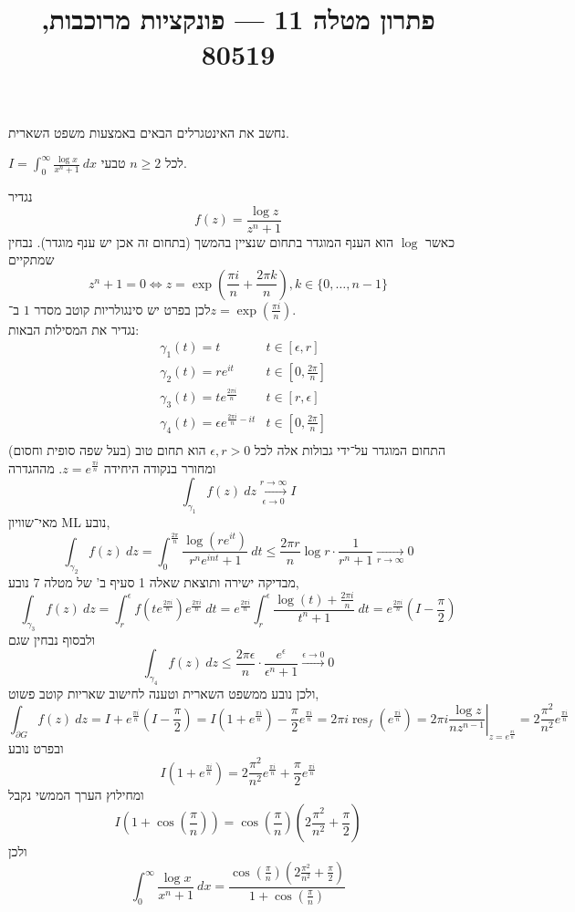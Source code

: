 
\title{פתרון מטלה 11 --- פונקציות מרוכבות, 80519}


\maketitle
\maketitleprint{}

\question{}
נחשב את האינטגרלים הבאים באמצעות משפט השארית.

\subquestion{}
$I = \int_0^\infty \frac{\log x}{x^n + 1}\ dx$ לכל $n \ge 2$ טבעי.
\begin{solution}
	נגדיר
	\[
		f(z) = \frac{\log z}{z^n + 1}
	\]
	כאשר $\log$ הוא הענף המוגדר בתחום שנציין בהמשך (בתחום זה אכן יש ענף מוגדר).
	נבחין שמתקיים
	\[
		z^n + 1 = 0
		\iff
		z = \exp(\frac{\pi i}{n} + \frac{2\pi k}{n}), k \in \{0, \dots, n - 1\}
	\]
	לכן בפרט יש סינגולריות קוטב מסדר $1$ ב־$z = \exp(\frac{\pi i}{n})$. \\
	נגדיר את המסילות הבאות:
	\begin{align*}
		& \gamma_1(t) = t & t \in [\epsilon, r] \\
		& \gamma_2(t) = r e^{it} & t \in [0, \frac{2\pi}{n}] \\
		& \gamma_3(t) = t e^{\frac{2\pi i}{n}} & t \in [r, \epsilon] \\
		& \gamma_4(t) = \epsilon e^{\frac{2\pi i}{n} - it} & t \in [0, \frac{2\pi}{n}] \\
	\end{align*}
	התחום המוגדר על־ידי גבולות אלה לכל $\epsilon, r > 0$ הוא תחום טוב (בעל שפה סופית וחסום) ומחורר בנקודה היחידה $z = e^{\frac{\pi i}{n}}$.
	מההגדרה
	\[
		\int_{\gamma_1} f(z)\ dz \xrightarrow[\epsilon \to 0]{r \to \infty} I
	\]
	מאי־שוויון ML נובע,
	\[
		\int_{\gamma_2} f(z)\ dz
		= \int_0^{\frac{2\pi}{n}} \frac{\log(re^{it})}{r^n e^{int} + 1}\ dt
		\le \frac{2\pi r}{n} \log r \cdot \frac{1}{r^n + 1}
		\xrightarrow[r \to \infty]{} 0
	\]
	מבדיקה ישירה ותוצאת שאלה 1 סעיף ב' של מטלה 7 נובע,
	\[
		\int_{\gamma_3} f(z)\ dz
		= \int_r^\epsilon f(t e^{\frac{2\pi i}{n}}) e^{\frac{2\pi i}{n}}\ dt
		= e^{\frac{2\pi i}{n}} \int_r^\epsilon \frac{\log(t) + \frac{2\pi i}{n}}{t^n + 1}\ dt
		= e^{\frac{2\pi i}{n}} (I - \frac{\pi}{2})
	\]
	ולבסוף נבחין שגם
	\[
		\int_{\gamma_4} f(z)\ dz
		\le \frac{2\pi \epsilon}{n} \cdot \frac{e^\epsilon}{\epsilon^n + 1}
		\xrightarrow{\epsilon \to 0} 0
	\]
	ולכן נובע ממשפט השארית וטענה לחישוב שאריות קוטב פשוט,
	\[
		\int_{\partial G} f(z)\ dz
		= I + e^{\frac{\pi i}{n}} (I - \frac{\pi}{2})
		= I (1 + e^{\frac{\pi i}{n}}) - \frac{\pi}{2} e^{\frac{\pi i}{n}}
		= 2\pi i \operatorname{res}_f(e^{\frac{\pi i}{n}})
		= 2\pi i \left. \frac{\log z}{n z^{n - 1}} \right\rvert_{z = e^{\frac{\pi i}{n}}}
		= 2 \frac{\pi^2}{n^2} e^{\frac{\pi i}{n}}
	\]
	ובפרט נובע
	\[
		I (1 + e^{\frac{\pi i}{n}})
		= 2 \frac{\pi^2}{n^2} e^{\frac{\pi i}{n}} + \frac{\pi}{2} e^{\frac{\pi i}{n}}
	\]
	ומחילוץ הערך הממשי נקבל
	\[
		I (1 + \cos(\frac{\pi}{n}))
		= \cos(\frac{\pi}{n}) (2 \frac{\pi^2}{n^2} + \frac{\pi}{2})
	\]
	ולכן
	\[
		\int_0^\infty \frac{\log x}{x^n + 1}\ dx
		= \frac{\cos(\frac{\pi}{n}) (2 \frac{\pi^2}{n^2} + \frac{\pi}{2})}{1 + \cos(\frac{\pi}{n})}
	\]
\end{solution}

